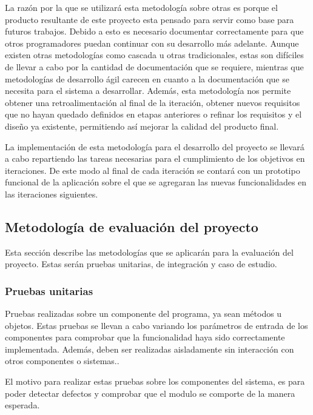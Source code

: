 \documentclass[11pt,letterpaper]{article}
\begin{document}
La razón por la que se utilizará esta metodología sobre otras es porque el producto resultante de este proyecto esta pensado para servir como base para futuros trabajos. Debido a esto es necesario documentar correctamente para que otros programadores puedan continuar con su desarrollo más adelante. Aunque existen otras metodologías como cascada u otras tradicionales, estas son difíciles de llevar a cabo por la cantidad de documentación que se requiere, mientras que metodologías de desarrollo ágil carecen en cuanto a la documentación que se necesita para el sistema a desarrollar. Además, esta metodología nos permite obtener una retroalimentación al final de la iteración, obtener nuevos requisitos que no hayan quedado definidos en etapas anteriores o refinar los requisitos y el diseño ya existente, permitiendo así mejorar la calidad del producto final.

La implementación de esta metodología para el desarrollo del proyecto se llevará a cabo repartiendo las tareas necesarias para el cumplimiento de los objetivos en iteraciones. De este modo al final de cada iteración se contará con un prototipo funcional de la aplicación sobre el que se agregaran las nuevas funcionalidades en las iteraciones siguientes.

\subsection{Metodología de evaluación del proyecto}

Esta sección describe las metodologías que se aplicarán para la evaluación del proyecto. Estas serán pruebas unitarias, de integración y caso de estudio.

\subsubsection{Pruebas unitarias}
Pruebas realizadas sobre un componente del programa, ya sean métodos u objetos. Estas pruebas se llevan a cabo variando los parámetros de entrada de los componentes para comprobar que la funcionalidad haya sido correctamente implementada. Además, deben ser realizadas aisladamente sin interacción con otros componentes o sistemas.\cite{Sommerville2010}.

El motivo para realizar estas pruebas sobre los componentes del sistema, es para poder detectar defectos y comprobar que el modulo se comporte de la manera esperada.
\end{document}
